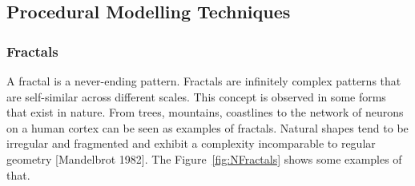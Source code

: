
\subsection{Procedural Modelling Techniques} %
\label{sub:procedural_modelling_techniques}

\subsubsection{Fractals} %
\label{ssub:fractals}


A fractal is a never-ending pattern. Fractals are infinitely complex patterns that are self-similar across different scales. 
This concept is observed in some forms that exist in nature. From trees, mountains, coastlines to the network of neurons on a human cortex can be seen as examples of fractals. Natural shapes tend to be irregular and fragmented and exhibit a complexity incomparable to regular geometry [Mandelbrot 1982]. The Figure~\ref{fig:NFractals} shows some examples of that. 



